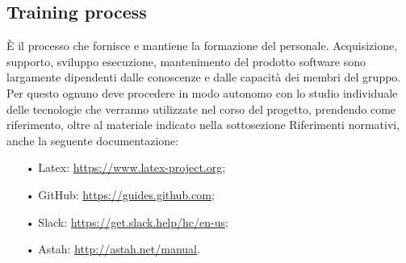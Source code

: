 \subsection{Training process}È il processo che fornisce e mantiene la formazione del personale. Acquisizione, supporto, sviluppo esecuzione, mantenimento del prodotto software sono largamente dipendenti dalle conoscenze e dalle capacità dei membri del gruppo. 
\newline
Per questo ognuno deve procedere in modo autonomo con lo studio individuale delle tecnologie che verranno utilizzate nel corso del progetto, prendendo come riferimento, oltre al materiale indicato nella sottosezione Riferimenti normativi, anche la seguente documentazione:
\begin{itemize}
\item[•] Latex: \url{https://www.latex-project.org};
\item[•] GitHub: \url{https://guides.github.com};
\item[•] Slack: \url{https://get.slack.help/hc/en-us};
\item[•] Astah: \url{http://astah.net/manual}.
\end{itemize}